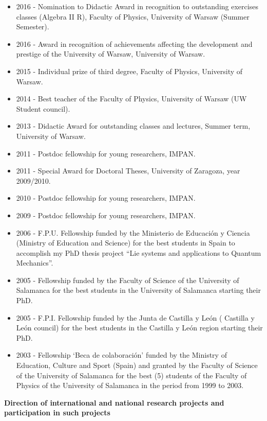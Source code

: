 \documentclass[12pt,reqno]{amsbook}
\begin{document}
\begin{itemize}
        \item 2016 - Nomination to Didactic  Award in recognition to outstanding exercises classes (Algebra II R), Faculty of Physics, University of Warsaw (Summer Semester).
        \item 2016 - Award in recognition of achievements affecting the development and prestige of the University of Warsaw, University of Warsaw.
        \item 2015 - Individual prize of third degree, Faculty of Physics, University of Warsaw.
        \item 2014 - Best teacher of the Faculty of Physics,  University of Warsaw (UW Student council).
        \item 2013 - Didactic Award for outstanding classes and lectures, Summer term, University of Warsaw.
        \item 2011 - Postdoc fellowship for young researchers, IMPAN.
        \item 2011 - Special Award for Doctoral Theses, University of Zaragoza, year 2009/2010.
        \item 2010 - Postdoc fellowship for young researchers, IMPAN.
        \item 2009 - Postdoc fellowship for young researchers, IMPAN.
        \item 2006 -  F.P.U.  Fellowship funded by the Ministerio de Educaci\'on y Ciencia (Ministry of Education and Science) for the best students in Spain to accomplish my PhD  thesis project ``Lie systems and applications to Quantum Mechanics''.
        \item 2005 -   Fellowship funded by the Faculty of Science of the University of Salamanca for the best students in the University of Salamanca starting their PhD.
        \item 2005 -  F.P.I. Fellowship funded by the Junta de Castilla y Le\'on ( Castilla y Le\'on council) for the best students in the Castilla y Le\'on region starting their PhD.
        \item 2003 - Fellowship `Beca de colaboraci\'on' funded by the Ministry of Education, Culture and Sport (Spain) and granted by the Faculty of Science of the University of Salamanca for the best (5) students of the Faculty of Physics of the University of Salamanca in the period from 1999 to 2003.
\end{itemize}

\vskip 0.4cm


{\bf Direction of international and national research projects and participation in such projects}
\vskip 0.5cm
\end{document}
